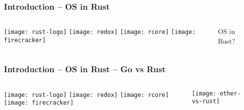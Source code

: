 \begin{frame}[plain]
	\frametitle{Introduction -- OS in Rust}
	
	
	
	\begin{columns}
		
		\begin{column}{.2\textwidth}
			
			\texttt{[image: rust-logo]}
			\texttt{[image: redox]}
			\texttt{[image: rcore]}
			\texttt{[image: firecracker]}
		\end{column}
		
		\begin{column}{.8\textwidth}
			\centering
			\LARGE
			OS in Rust?
			
			
		\end{column}
		
		
	\end{columns}
	
	
\end{frame}


\begin{frame}[plain]
	\frametitle{Introduction -- OS in Rust -- Go vs Rust}
	
	
	
	\begin{columns}
		
		\begin{column}{.2\textwidth}
			
			\texttt{[image: rust-logo]}
			\texttt{[image: redox]}
			\texttt{[image: rcore]}
			\texttt{[image: firecracker]}
		\end{column}
		
		\begin{column}{.8\textwidth}
			\texttt{[image: other-vs-rust]}
			
			
		\end{column}
		
		
	\end{columns}
	
	
\end{frame}


